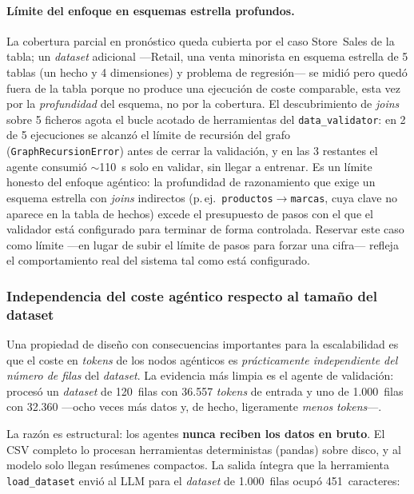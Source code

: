 \paragraph{Límite del enfoque en esquemas estrella profundos.}
La cobertura parcial en pronóstico queda cubierta por el caso Store~Sales de la tabla; un
\textit{dataset} adicional —Retail, una venta minorista en esquema estrella de 5 tablas (un
hecho y 4 dimensiones) y problema de regresión— se midió pero quedó fuera de la tabla porque
no produce una ejecución de coste comparable, esta vez por la \emph{profundidad} del esquema,
no por la cobertura. El descubrimiento de \textit{joins} sobre 5
ficheros agota el bucle acotado de herramientas del \texttt{data\_validator}: en 2 de 5
ejecuciones se alcanzó el límite de recursión del grafo (\texttt{GraphRecursionError})
antes de cerrar la validación, y en las 3 restantes el agente consumió $\sim$110~s solo en
validar, sin llegar a entrenar. Es un límite honesto del enfoque agéntico: la profundidad
de razonamiento que exige un esquema estrella con \textit{joins} indirectos
(p.\,ej.\ \texttt{productos}$\rightarrow$\texttt{marcas}, cuya clave no aparece en la tabla
de hechos) excede el presupuesto de pasos con el que el validador está configurado para
terminar de forma controlada. Reservar este caso como límite —en lugar de subir el límite
de pasos para forzar una cifra— refleja el comportamiento real del sistema tal como está
configurado.


\subsubsection{Independencia del coste agéntico respecto al tamaño del dataset}
\label{sec:coste-tamano}

Una propiedad de diseño con consecuencias importantes para la escalabilidad es que el
coste en \textit{tokens} de los nodos agénticos es \emph{prácticamente independiente del
número de filas} del \textit{dataset}. La evidencia más limpia es el agente de
validación: procesó un \textit{dataset} de 120~filas con 36.557 \textit{tokens} de
entrada y uno de 1.000~filas con 32.360 —ocho veces más datos y, de hecho, ligeramente
\emph{menos} \textit{tokens}—.

La razón es estructural: los agentes \textbf{nunca reciben los datos en bruto}. El CSV
completo lo procesan herramientas deterministas (pandas) sobre disco, y al modelo solo
llegan resúmenes compactos. La salida íntegra que la herramienta \texttt{load\_dataset}
envió al LLM para el \textit{dataset} de 1.000~filas ocupó 451~caracteres:

